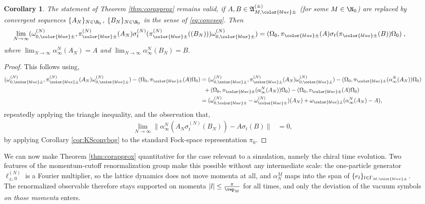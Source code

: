 \documentclass[a4paper, 11pt]{article}
\newcommand{\fA}{\mathfrak{A}}\newcommand{\cA}{\mathcal{A}}\newcommand{\dA}{\mathds{A}}\newcommand{\sA}{\mathscr{A}}
\DeclareMathOperator{\1}{\mathds{1}}
\newtheorem{cor}[thm]{Corollary}
\begin{document}
\begin{cor}
\label{cor:corapprox}
The statement of Theorem \ref{thm:corapprox} remains valid, if $A,B\in\fA^{(\pm)}_{M,{\color{blue}\pm}}$ (for some $M\in\N_{0}$) are replaced by convergent sequences $\{A_{N}\}_{N\in\N_{0}}$, $\{B_{N}\}_{N\in\N_{0}}$ in the sense of \eqref{eq:convseq}. Then
\begin{align*}
\lim_{N\rightarrow\infty}(\omega^{(N)}_{0,{\color{blue}\pm}},\pi^{(N)}_{{\color{blue}\pm}}(A_{N})\sigma^{(N)}_{t}(\pi^{(N)}_{{\color{blue}\pm}}((B_{N})))\omega^{(N)}_{0,{\color{blue}\pm}}) & = (\Omega_{0},\pi_{{\color{blue}\pm}}(A)\sigma_{t}(\pi_{{\color{blue}\pm}}(B))\Omega_{0})\;,
\end{align*}
where $\lim_{N\rightarrow\infty}\alpha^{N}_{\infty}(A_{N}) = A$ and $\lim_{N\rightarrow\infty}\alpha^{N}_{\infty}(B_{N}) = B$.
\end{cor}
\begin{proof}
This follows using,
\begin{align*}
(\omega^{(N)}_{0,{\color{blue}\pm}},\pi^{(N)}_{{\color{blue}\pm}}(A_{N})\omega^{(N)}_{0,{\color{blue}\pm}}) - (\Omega_{0},\pi_{{\color{blue}\pm}}(A)\Omega_{0})& = (\omega^{(N)}_{0,{\color{blue}\pm}},\pi^{(N)}_{{\color{blue}\pm}}(A_{N})\omega^{(N)}_{0,{\color{blue}\pm}}) - (\Omega_{0},\pi_{{\color{blue}\pm}}(\alpha^{N}_{\infty}(A_{N}))\Omega_{0}) \\
& \hspace{0.2cm} + (\Omega_{0},\pi_{{\color{blue}\pm}}(\alpha^{N}_{\infty}(A_{N}))\Omega_{0}) - (\Omega_{0},\pi_{{\color{blue}\pm}}(A)\Omega_{0}) \\
& = (\omega^{(N)}_{0,{\color{blue}\pm}} - \omega^{(N)}_{{\color{blue}\pm}})(A_{N})+\omega_{{\color{blue}\pm}}(\alpha^{N}_{\infty}(A_{N})-A),
\end{align*}
repeatedly applying the triangle inequality, and the observation that,
\begin{align*}
\lim_{N\rightarrow\infty}\|\alpha^{N}_{\infty}(A_{N}\sigma^{(N)}_{t}(B_{N}))-A\sigma_{t}(B)\| & = 0,
\end{align*}
by applying Corollary \ref{cor:KSconvbog} to the standard Fock-space representation $\pi_{0}$.
\end{proof}

We can now make Theorem \ref{thm:corapprox} quantitative for the case relevant to a simulation, namely the chiral time evolution. Two features of the momentum-cutoff renormalization group make this possible without any intermediate scale: the one-particle generator $\ell^{(N)}_{\pm,0}$ is a Fourier multiplier, so the lattice dynamics does not move momenta at all, and $\alpha^{M}_{N}$ maps into the span of $\{e_{l}\}_{l\in\Gamma_{M,{\color{blue}\pm}}}$. The renormalized observable therefore stays supported on momenta $|l|\leq\tfrac{\pi}{\vep_{M}}$ for all times, and only the deviation of the vacuum symbols \emph{on those momenta} enters.
\end{document}
